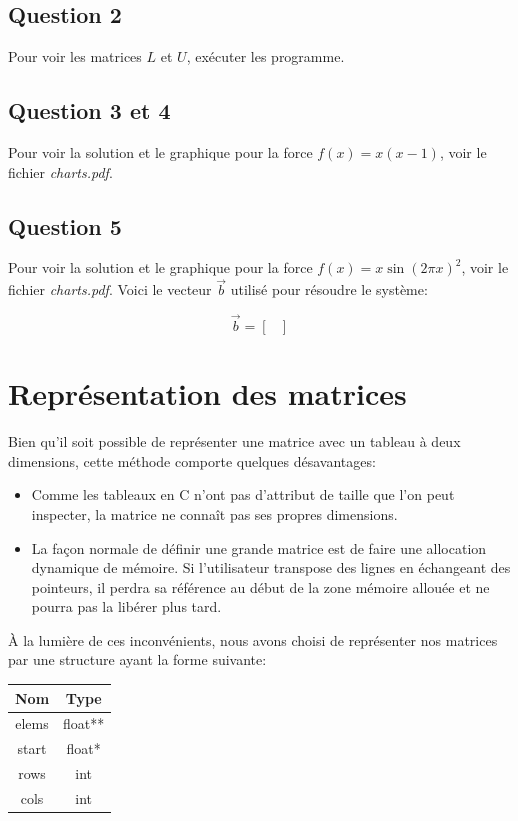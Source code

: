 \documentclass[10pt]{article}
\begin{document}
\subsection{Question 2}

Pour voir les matrices $L$ et $U$, exécuter les programme.

\subsection{Question 3 et 4}

Pour voir la solution et le graphique pour la force $f(x) = x(x-1)$,
voir le fichier \emph{charts.pdf}.

\subsection{Question 5}

Pour voir la solution et le graphique pour la force $f(x) = x\sin(2\pi
x)^2$, voir le fichier \emph{charts.pdf}.  Voici le vecteur $\vec{b}$
utilisé pour résoudre le système:

\[
\vec{b} = \begin{bmatrix}

\end{bmatrix}
\]

\section{Représentation des matrices}

Bien qu'il soit possible de représenter une matrice avec un tableau à
deux dimensions, cette méthode comporte quelques désavantages:

\begin{itemize}
\item Comme les tableaux en C n'ont pas d'attribut de taille que l'on
  peut inspecter, la matrice ne connaît pas ses propres dimensions.
\item La façon normale de définir une grande matrice est de faire une
  allocation dynamique de mémoire.  Si l'utilisateur transpose des
  lignes en échangeant des pointeurs, il perdra sa référence au début
  de la zone mémoire allouée et ne pourra pas la libérer plus tard.
\end{itemize}

À la lumière de ces inconvénients, nous avons choisi de représenter
nos matrices par une structure ayant la forme suivante:

\begin{center}
  \begin{tabular}{|c|c|}
    \hline
    Nom & Type \\
    \hline
    elems & float** \\
    start & float* \\
    rows & int \\
    cols & int \\
    \hline
  \end{tabular}
\end{center}
\end{document}
